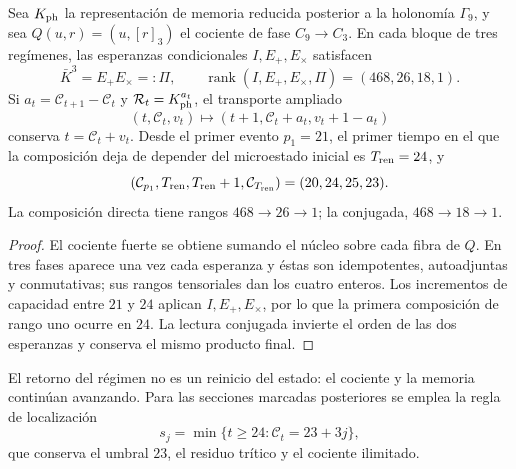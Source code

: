 \begin{proposition}
\label{v:prop:renovacion-capacidad-24}
Sea $K_{\rm ph}$ la representación de memoria reducida posterior a la
holonomía $\Gamma_9$, y sea $Q(u,r)=(u,[r]_3)$ el cociente de fase
$C_9\to C_3$. En cada bloque de tres regímenes, las esperanzas condicionales
$I,E_+,E_\times$ satisfacen
\[
 \bar K^3=E_+E_\times=:\Pi,\qquad
 \operatorname{rank}(I,E_+,E_\times,\Pi)=(468,26,18,1).
\]
Si $a_t=\mathcal C_{t+1}-\mathcal C_t$ y
$\mathcal R_t=K_{\rm ph}^{a_t}$, el transporte ampliado
\[
 (t,\mathcal C_t,v_t)\longmapsto
 (t+1,\mathcal C_t+a_t,v_t+1-a_t)
\]
conserva $t=\mathcal C_t+v_t$. Desde el primer evento $p_1=21$, el
primer tiempo en el que la composición deja de depender del microestado
inicial es $T_{\rm ren}=24$, y
\begin{equation}
 (\mathcal C_{p_1},T_{\rm ren},T_{\rm ren}+1,
   \mathcal C_{T_{\rm ren}})=(20,24,25,23).
 \label{v:eq:tupla-renovacion-capacidad}
\end{equation}
La composición directa tiene rangos $468\to26\to1$; la conjugada,
$468\to18\to1$.
\end{proposition}
\begin{proof}
El cociente fuerte se obtiene sumando el núcleo sobre cada fibra de $Q$.
En tres fases aparece una vez cada esperanza y éstas son idempotentes,
autoadjuntas y conmutativas; sus rangos tensoriales dan los cuatro enteros.
Los incrementos de capacidad entre $21$ y $24$ aplican
$I,E_+,E_\times$, por lo que la primera composición de rango uno ocurre
en $24$. La lectura conjugada invierte el orden de las dos esperanzas y
conserva el mismo producto final.
\end{proof}

El retorno del régimen no es un reinicio del estado: el cociente y la memoria
continúan avanzando. Para las secciones marcadas posteriores se emplea la
regla de localización
\[
 s_j=\min\{t\ge24:\mathcal C_t=23+3j\},
\]
que conserva el umbral $23$, el residuo trítico y el cociente ilimitado.
